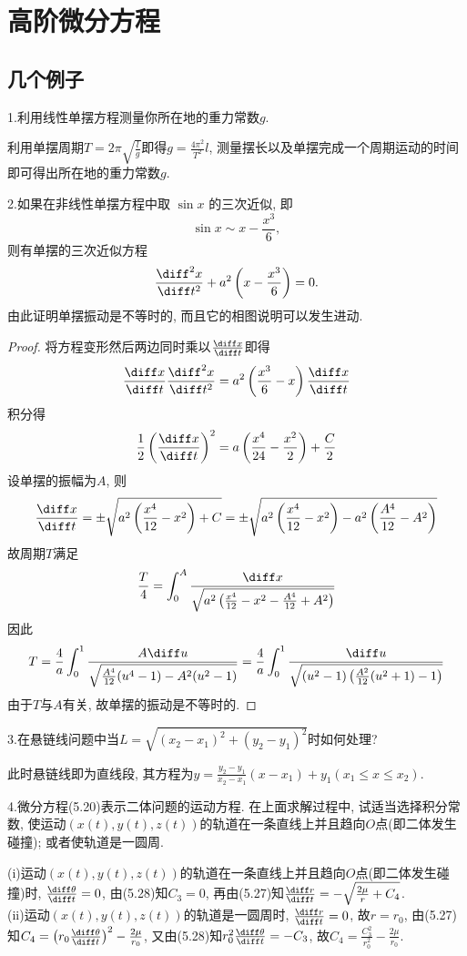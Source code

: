 \chapter{高阶微分方程}


\section{几个例子}


1.利用线性单摆方程测量你所在地的重力常数$g$.

\begin{solve} 
利用单摆周期$T=2\pi\sqrt{\frac{l}{g}}$即得$g=\frac{4\pi^2}{T^2}l$, 测量摆长以及单摆完成一个周期运动的时间即可得出所在地的重力常数$g$.
\end{solve}


2.如果在非线性单摆方程中取 $\sin x$ 的三次近似, 即
\[\sin x\sim x-\frac{x^3}{6},\]
则有单摆的三次近似方程\[\frac{\diff^2x}{\diff t^2}+a^2\left(x-\frac{x^3}{6}\right)=0.\]
由此证明单摆振动是不等时的, 而且它的相图说明可以发生进动.

\begin{proof}
将方程变形然后两边同时乘以$\frac{\diff x}{\diff t}$即得
\[\frac{\diff x}{\diff t}\frac{\diff^2x}{\diff t^2}=a^2\left(\frac{x^3}{6}-x\right)\frac{\diff x}{\diff t}\]
积分得\[\frac{1}{2}\left(\frac{\diff x}{\diff t}\right)^2=a\left(\frac{x^4}{24}-\frac{x^2}{2}\right)+\frac{C}{2}\]
设单摆的振幅为$A$, 则
\[\frac{\diff x}{\diff t}=\pm\sqrt{a^2\left(\frac{x^4}{12}-x^2\right)+C}=\pm\sqrt{a^2\left(\frac{x^4}{12}-x^2\right)-a^2\left(\frac{A^4}{12}-A^2\right)}\]
故周期$T$满足
\[\frac{T}{4}=\int_0^A\frac{\diff x}{\sqrt{a^2\left(\frac{x^4}{12}-x^2-\frac{A^4}{12}+A^2\right)}}\]
因此\[T=\frac{4}{a}\int_0^1\frac{A\diff u}{\sqrt{\frac{A^4}{12}(u^4-1)-A^2(u^2-1)}}=\frac{4}{a}\int_0^1\frac{\diff u}{\sqrt{(u^2-1)\left(\frac{A^2}{12}(u^2+1)-1\right)}}\]
由于$T$与$A$有关, 故单摆的振动是不等时的.
\end{proof}


3.在悬链线问题中当$L=\sqrt{(x_2-x_1)^2+(y_2-y_1)^2}$时如何处理?

\begin{solve} 
此时悬链线即为直线段, 其方程为$y=\frac{y_2-y_1}{x_2-x_1}(x-x_1)+y_1(x_1\leq x\leq x_2)$.
\end{solve}


4.微分方程(5.20)表示二体问题的运动方程. 在上面求解过程中, 试适当选择积分常数, 
使运动$(x(t),y(t),z(t))$的轨道在一条直线上并且趋向$O$点(即二体发生碰撞); 或者使轨道是一圆周.

\begin{solve} 
(i)运动$(x(t),y(t),z(t))$的轨道在一条直线上并且趋向$O$点(即二体发生碰撞)时, $\frac{\diff\theta}{\diff t}=0$, 由(5.28)知$C_3=0$, 再由(5.27)知$\frac{\diff r}{\diff t}=-\sqrt{\frac{2\mu}{r}+C_4}$.\\
(ii)运动$(x(t),y(t),z(t))$的轨道是一圆周时, $\frac{\diff r}{\diff t}=0$, 故$r=r_0$, 由(5.27)知$C_4=\left(r_0\frac{\diff\theta}{\diff t}\right)^2-\frac{2\mu}{r_0}$, 又由(5.28)知$r_0^2\frac{\diff\theta}{\diff t}=-C_3$, 故$C_4=\frac{C_3^2}{r_0^2}-\frac{2\mu}{r_0}$.
\end{solve}


